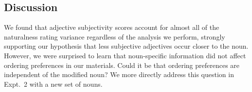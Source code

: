 \documentclass[12pt]{article}
\begin{document}

\subsection{Discussion}

We found that adjective subjectivity scores account for almost all of the naturalness rating variance regardless of the analysis we perform, strongly supporting our hypothesis that less subjective adjectives occur closer to the noun. However, we were surprised to learn that noun-specific information did not affect ordering preferences in our materials. Could it be that ordering preferences are independent of the modified noun? We more directly address this question in Expt.~2 with a new set of nouns.%

\end{document}
